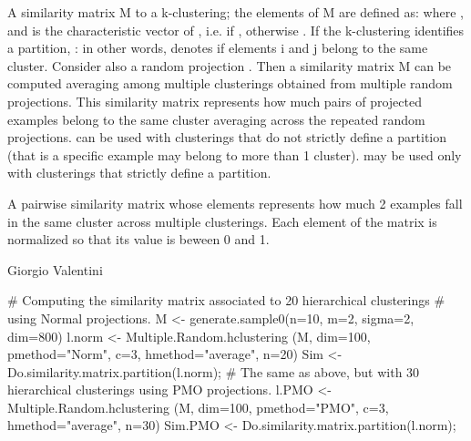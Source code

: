 \documentclass{article}
\begin{document}
\begin{Details}\relax
A  similarity matrix M to a k-clustering; the elements  of M are
defined as:
where , and  is the characteristic vector of 
,
i.e.  if , otherwise .
If the k-clustering identifies a partition, : in other words,  denotes if elements 
i and j belong to the same cluster. 
Consider also a  random projection .
Then a  similarity matrix M can be computed averaging among multiple clusterings obtained from multiple random
projections. This similarity matrix represents how much pairs of projected examples  belong to the
same cluster averaging across the  repeated random projections.
 can be used with clusterings that do not strictly define a partition (that is a specific
example may belong to more than 1 cluster).  may be used only with clusterings that
strictly define a partition.
\end{Details}
\begin{Value}
A pairwise similarity matrix whose elements represents how much 2 examples fall in the same cluster across multiple 
clusterings. Each element of the matrix is normalized so that its value is beween 0 and 1.
\end{Value}
\begin{Author}\relax
Giorgio Valentini 
\end{Author}
\begin{Examples}
\begin{ExampleCode}
# Computing the similarity matrix associated to 20 hierarchical clusterings 
# using Normal projections. 
M <- generate.sample0(n=10, m=2, sigma=2, dim=800)
l.norm <- Multiple.Random.hclustering (M, dim=100, pmethod="Norm", c=3, 
                                       hmethod="average", n=20)
Sim <- Do.similarity.matrix.partition(l.norm);
# The same as above, but with 30 hierarchical clusterings using PMO projections. 
l.PMO <- Multiple.Random.hclustering (M, dim=100, pmethod="PMO", c=3, 
                                      hmethod="average", n=30)
Sim.PMO <- Do.similarity.matrix.partition(l.norm);
\end{ExampleCode}
\end{Examples}
\end{document}
